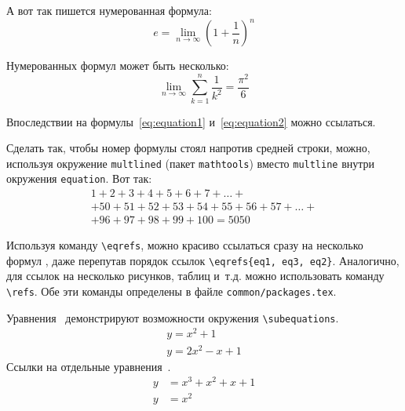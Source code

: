 А вот так пишется нумерованная формула:
\begin{equation}
  \label{eq:equation1}
  e = \lim_{n \to \infty} \left( 1+\frac{1}{n} \right) ^n
\end{equation}

Нумерованных формул может быть несколько:
\begin{equation}
  \label{eq:equation2}
  \lim_{n \to \infty} \sum_{k=1}^n \frac{1}{k^2} = \frac{\pi^2}{6}
\end{equation}

Впоследствии на формулы~\eqref{eq:equation1} и~\eqref{eq:equation2} можно ссылаться.

Сделать так, чтобы номер формулы стоял напротив средней строки, можно,
используя окружение \verb|multlined| (пакет \verb|mathtools|) вместо
\verb|multline| внутри окружения \verb|equation|. Вот так:
\begin{equation} %
  \label{eq:equation3}
    \begin{multlined}
        1+ 2+3+4+5+6+7+\dots + \\
        + 50+51+52+53+54+55+56+57 + \dots + \\
        + 96+97+98+99+100=5050
    \end{multlined}
\end{equation}

Используя команду \verb|\eqrefs|, можно
красиво ссылаться сразу на несколько формул
, даже перепутав
порядок ссылок \verb|\eqrefs{eq1, eq3, eq2}|.
Аналогично, для ссылок на несколько рисунков, таблиц и~т.\:д.
 можно использовать
команду \verb|\refs|.
Обе эти команды определены в файле \verb|common/packages.tex|.

Уравнения~ демонстрируют возможности
окружения \verb|\subequations|.
\begin{subequations}
    \label{eq:subeq_1}
    \begin{gather}
        y = x^2 + 1 \label{eq:subeq_1-1} \\
        y = 2 x^2 - x + 1 \label{eq:subeq_1-2}
    \end{gather}
\end{subequations}
Ссылки на отдельные уравнения~.
\begin{subequations}
    \label{eq:subeq_2}
    \begin{align}
        y &= x^3 + x^2 + x + 1 \label{eq:subeq_2-1} \\
        y &= x^2
    \end{align}
\end{subequations}

